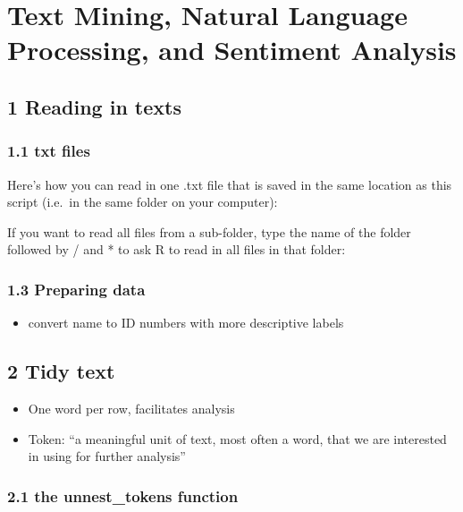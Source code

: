 \documentclass[a4paper, nobind]{templates/ociamthesis}
\providecommand{\tightlist}{%
  \setlength{\itemsep}{0pt}\setlength{\parskip}{0pt}}
\begin{document}
\hypertarget{text-mining-natural-language-processing-and-sentiment-analysis}{%
\chapter{Text Mining, Natural Language Processing, and Sentiment Analysis}\label{text-mining-natural-language-processing-and-sentiment-analysis}}

\hypertarget{reading-in-texts}{%
\section{1 Reading in texts}\label{reading-in-texts}}

\hypertarget{txt-files}{%
\subsection{1.1 txt files}\label{txt-files}}

Here's how you can read in one .txt file that is saved in the same location as this script (i.e.~in the same folder on your computer):

If you want to read all files from a sub-folder, type the name of the folder followed by / and * to ask R to read in all files in that folder:

\hypertarget{preparing-data}{%
\subsection{1.3 Preparing data}\label{preparing-data}}

\begin{itemize}
\tightlist
\item
  convert name to ID numbers with more descriptive labels
\end{itemize}

\hypertarget{tidy-text}{%
\section{2 Tidy text}\label{tidy-text}}

\begin{itemize}
\tightlist
\item
  One word per row, facilitates analysis
\item
  Token: ``a meaningful unit of text, most often a word, that we are interested in using for further analysis''
\end{itemize}

\hypertarget{the-unnest_tokens-function}{%
\subsection{2.1 the unnest\_tokens function}\label{the-unnest_tokens-function}}
\end{document}
